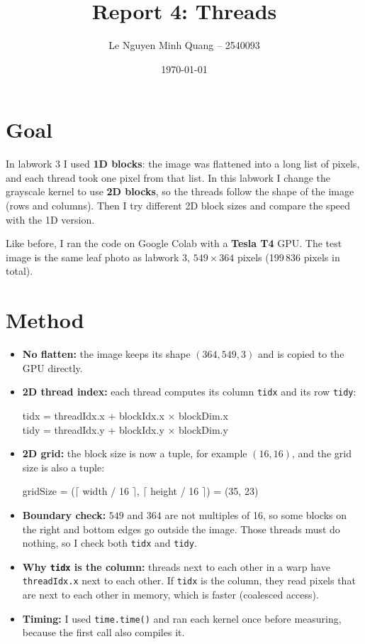 \documentclass[11pt,a4paper]{article}
\title{Report 4: Threads}
\author{Le Nguyen Minh Quang -- 2540093}
\date{\today}
\begin{document}
\maketitle

\section{Goal}
In labwork 3 I used \textbf{1D blocks}: the image was flattened into a
long list of pixels, and each thread took one pixel from that list. In
this labwork I change the grayscale kernel to use \textbf{2D blocks},
so the threads follow the shape of the image (rows and columns). Then I
try different 2D block sizes and compare the speed with the 1D version.

Like before, I ran the code on Google Colab with a \textbf{Tesla T4}
GPU. The test image is the same leaf photo as labwork 3,
$549 \times 364$ pixels (199\,836 pixels in total).

\section{Method}
\begin{itemize}
  \item \textbf{No flatten:} the image keeps its shape $(364, 549, 3)$
  and is copied to the GPU directly.
  \item \textbf{2D thread index:} each thread computes its column
  \texttt{tidx} and its row \texttt{tidy}:
  \begin{center}
    tidx = threadIdx.x + blockIdx.x $\times$ blockDim.x \\
    tidy = threadIdx.y + blockIdx.y $\times$ blockDim.y
  \end{center}
  \item \textbf{2D grid:} the block size is now a tuple, for example
  $(16, 16)$, and the grid size is also a tuple:
  \begin{center}
    gridSize = ($\lceil$ width / 16 $\rceil$,
                $\lceil$ height / 16 $\rceil$) = (35, 23)
  \end{center}
  \item \textbf{Boundary check:} $549$ and $364$ are not multiples of
  16, so some blocks on the right and bottom edges go outside the image.
  Those threads must do nothing, so I check both \texttt{tidx} and
  \texttt{tidy}.
  \item \textbf{Why \texttt{tidx} is the column:} threads next to each
  other in a warp have \texttt{threadIdx.x} next to each other. If
  \texttt{tidx} is the column, they read pixels that are next to each
  other in memory, which is faster (coalesced access).
  \item \textbf{Timing:} I used \texttt{time.time()} and ran each kernel
  once before measuring, because the first call also compiles it.
\end{itemize}
\end{document}
